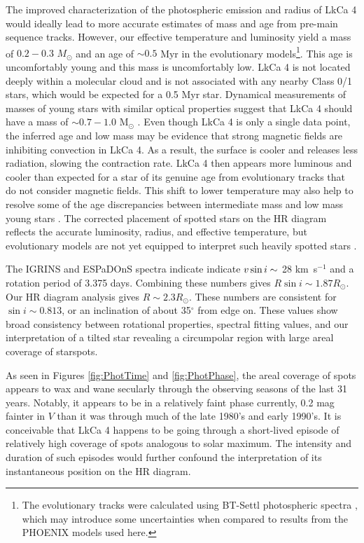 \documentclass[twocolumn]{emulateapj}%
\begin{document}
The improved characterization of the photospheric emission and radius of LkCa 4 would ideally lead to more accurate estimates of mass and age from pre-main sequence tracks.  However, our effective temperature and luminosity yield a mass of $0.2-0.3$ $M_\odot$ and an age of $\sim 0.5$ Myr in the \citet{baraffe15} evolutionary models\footnote{The \citet{baraffe15} evolutionary tracks were calculated using BT-Settl photospheric spectra \citep{allard14}, which may introduce some uncertainties when compared to results from the PHOENIX models used here.}.  This age is uncomfortably young and this mass is uncomfortably low.  LkCa 4 is not located deeply within a molecular cloud and is not associated with any nearby Class 0/1 stars, which would be expected for a 0.5 Myr star.  Dynamical measurements of masses of young stars with similar optical properties suggest that LkCa 4 should have a mass of $\sim 0.7-1.0$ M$_\odot$ \citep[e.g.][]{guilloteau14,czekala16,rizzuto16}.  Even though LkCa 4 is only a single data point, the inferred age and low mass may be evidence that strong magnetic fields are inhibiting convection in LkCa 4.  As a result, the surface is cooler and releases less radiation, slowing the contraction rate.  LkCa 4 then appears more luminous and cooler than expected for a star of its genuine age from evolutionary tracks that do not consider magnetic fields.   This shift to lower temperature may also help to resolve some of the age discrepancies between intermediate mass and low mass young stars \citep[e.g.][]{herczeg15}.  The corrected placement of spotted stars on the HR diagram reflects the accurate luminosity, radius, and effective temperature, but evolutionary models are not yet equipped to interpret such heavily spotted stars \citep{somers15}.

The IGRINS and ESPaDOnS spectra indicate indicate $v \sin i\sim$ 28 km~s$^{-1}$ and a rotation period of 3.375 days. Combining these numbers gives $R\sin{i} \sim 1.87 R_{\odot}$. Our HR diagram analysis gives $R \sim 2.3R_{\odot}$. These numbers are consistent for $\sin{i} \sim 0.813$, or an inclination of about 35$^{\circ}$ from edge on. These values show broad consistency between rotational properties, spectral fitting values, and our interpretation of a tilted star revealing a circumpolar region with large areal coverage of starspots.

As seen in Figures \ref{fig:PhotTime} and \ref{fig:PhotPhase}, the areal coverage of spots appears to wax and wane secularly through the observing seasons of the last 31 years.  Notably, it appears to be in a relatively faint phase currently, 0.2 mag fainter in $V$ than it was through much of the late 1980's and early 1990's.  It is conceivable that LkCa 4 happens to be going through a short-lived episode of relatively high coverage of spots analogous to solar maximum.  The intensity and duration of such episodes would further confound the interpretation of its instantaneous position on the HR diagram.
\end{document}
